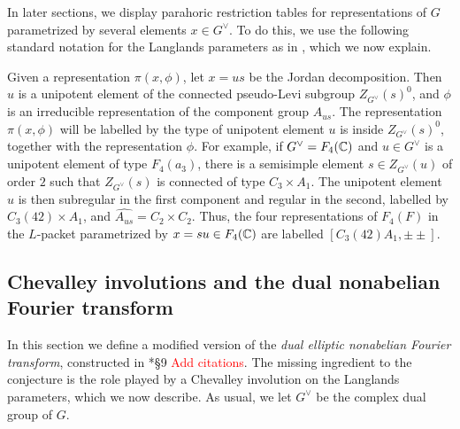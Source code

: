In later sections, we display parahoric restriction tables for representations of $G$ parametrized by several elements $x\in G^\vee$. To do this, we use the following standard notation for the Langlands parameters as in \cite{Reeder2000}, which we now explain. 
\begin{notation}\label{notation:Langlandsparam}
    Given a representation $\pi(x,\phi)$, let $x=us$ be the Jordan decomposition. Then $u$ is a unipotent element of the connected pseudo-Levi subgroup $Z_{G^\vee}(s)^0$, and $\phi$ is an irreducible representation of the component group $A_{us}$. The representation $\pi(x,\phi)$ will be labelled by the type of unipotent element $u$ is inside $Z_{G^\vee}(s)^0$, together with the representation $\phi$. For example, if $G^\vee=F_4(\mathbb{C})$ and $u\in G^\vee$ is a unipotent element of type $F_4(a_3)$, there is a semisimple element $s\in Z_{G^\vee}(u)$ of order $2$ such that $Z_{G^\vee}(s)$ is connected of type $C_3\times A_1$. The unipotent element $u$ is then subregular in the first component and regular in the second, labelled by $C_3(42)\times A_1$, and $\widehat{A_{us}}=C_2\times C_2$. Thus, the four representations of $F_4(F)$ in the $L$-packet parametrized by $x=su\in F_4(\mathbb{C})$ are labelled $[C_3(42)A_1,\pm\pm]$. %
\end{notation}


\subsection{Chevalley involutions and the dual nonabelian Fourier transform}\label{subsec:Fourier_transform}

In this section we define a modified version of the \textit{dual elliptic nonabelian Fourier transform}, constructed in \cite{AubertCiubotaruRomano2024}*{\S9} \textcolor{red}{Add citations}. The missing ingredient to the conjecture is the role played by a Chevalley involution on the Langlands parameters, which we now describe. As usual, we let $G^\vee$ be the complex dual group of $G$.


